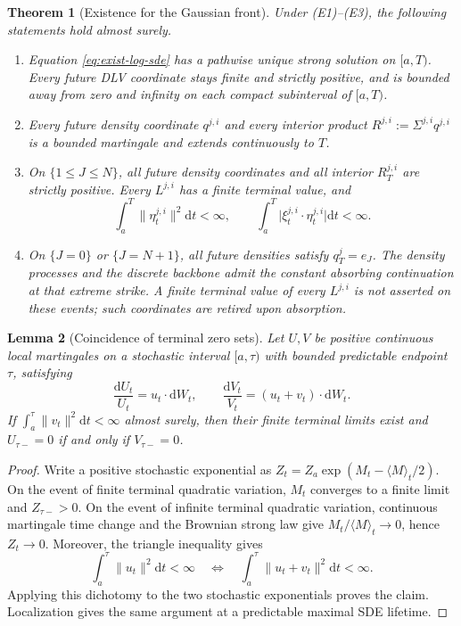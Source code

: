 \documentclass[11pt]{article}
\newcommand{\dd}{\mathrm d}
\newcommand{\abs}[1]{\lvert #1\rvert}
\theoremstyle{plain}
\newtheorem{theorem}{Theorem}[section]
\newtheorem{lemma}[theorem]{Lemma}
\theoremstyle{definition}
\theoremstyle{remark}
\begin{document}
\begin{theorem}[Existence for the Gaussian front]\label{thm:existence}
Under (E1)--(E3), the following statements hold almost surely.
\begin{enumerate}[label=(\roman*),leftmargin=*]
 \item Equation \eqref{eq:exist-log-sde} has a pathwise unique strong
 solution on $[a,T)$. Every future DLV coordinate stays finite and
 strictly positive, and is bounded away from zero and infinity on
 each compact subinterval of $[a,T)$.
 \item Every future density coordinate $q^{j,i}$ and every interior
 product $R^{j,i}:=\Sigma^{j,i}q^{j,i}$ is a bounded martingale and
 extends continuously to $T$.
 \item On $\{1\le J\le N\}$, all future density coordinates and all
 interior $R^{j,i}_T$ are strictly positive. Every $L^{j,i}$ has a
 finite terminal value, and
 \begin{equation}\label{eq:exist-terminal-energy}
 \int_a^T\lVert\eta_t^{j,i}\rVert^2\dd t<\infty,
 \qquad
 \int_a^T\abs{\xi_t^{j,i}\cdot\eta_t^{j,i}}\dd t<\infty.
 \end{equation}
 \item On $\{J=0\}$ or $\{J=N+1\}$, all future densities satisfy
 $q_T^j=e_J$. The density processes and the discrete backbone admit
 the constant absorbing continuation at that extreme strike.
 A finite terminal value of every $L^{j,i}$ is not asserted on these
 events; such coordinates are retired upon absorption.
\end{enumerate}
\end{theorem}

\begin{lemma}[Coincidence of terminal zero sets]\label{lem:exist-zero-sets}
Let $U,V$ be positive continuous local martingales on a stochastic interval
$[a,\tau)$ with bounded predictable endpoint $\tau$, satisfying
\[
 \frac{\dd U_t}{U_t}=u_t\cdot\dd W_t,
 \qquad
 \frac{\dd V_t}{V_t}=(u_t+v_t)\cdot\dd W_t.
\]
If $\int_a^\tau\lVert v_t\rVert^2\dd t<\infty$ almost surely, then
their finite terminal limits exist and
$U_{\tau-}=0$ if and only if $V_{\tau-}=0$.
\end{lemma}
\begin{proof}
Write a positive stochastic exponential as
$Z_t=Z_a\exp(M_t-\langle M\rangle_t/2)$. On the event of finite terminal
quadratic variation, $M_t$ converges to a finite limit and $Z_{\tau-}>0$.
On the event of infinite terminal quadratic variation, continuous
martingale time change and the Brownian strong law give
$M_t/\langle M\rangle_t\to0$, hence $Z_t\to0$.
Moreover, the triangle inequality gives
\[
 \int_a^\tau\lVert u_t\rVert^2\dd t<\infty
 \quad\Longleftrightarrow\quad
 \int_a^\tau\lVert u_t+v_t\rVert^2\dd t<\infty.
\]
Applying this dichotomy to the two stochastic exponentials proves the
claim. Localization gives the same argument at a predictable maximal
SDE lifetime.
\end{proof}
\end{document}
